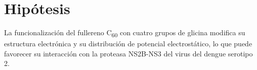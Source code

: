 \titleformat{\chapter}[display]
  {\normalfont\bfseries}{}{0pt}{\Large} %
\chapter{Hipótesis}
La funcionalización del fullereno C\textsubscript{60} con cuatro grupos de glicina modifica su estructura electrónica y su distribución de potencial electrostático, lo que puede favorecer su interacción con la proteasa NS2B-NS3 del virus del dengue serotipo 2.
